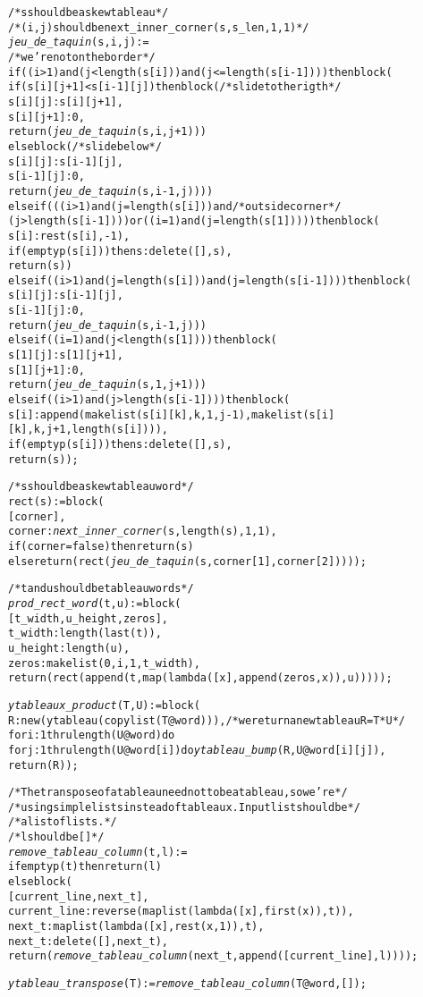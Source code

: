 \begin{alltt}
/* s should be a skew tableau */
/* (i,j) should be next\_inner\_corner (s, s\_len, 1, 1) */
\emph{jeu\_de\_taquin} (s, i, j) :=
/* we're not on the border */
if ((i > 1) and (j < length (s[i])) and (j <= length (s[i-1]))) then block ( 
  if (s[i][j+1] < s[i-1][j]) then block ( /* slide to the rigth */
    s[i][j] : s[i][j+1],
    s[i][j+1] : 0,
    return (\emph{jeu\_de\_taquin} (s, i, j+1)))
  else block ( /* slide below */
    s[i][j] : s[i-1][j],
    s[i-1][j] : 0,
    return (\emph{jeu\_de\_taquin} (s, i-1, j))))
else if (((i > 1) and (j = length (s[i])) and /* outside corner */
        (j > length (s[i-1]))) or ((i = 1) and (j = length (s[1])))) then block (
  s[i] : rest (s[i], -1),
  if (emptyp (s[i])) then s : delete ([], s),
  return (s))
else if ((i > 1) and (j = length (s[i])) and (j = length (s[i-1]))) then block (
  s[i][j] : s[i-1][j],
  s[i-1][j] : 0,
  return (\emph{jeu\_de\_taquin} (s, i-1, j)))
else if ((i = 1) and (j < length (s[1]))) then block (
  s[1][j] : s[1][j+1],
  s[1][j+1] : 0,
  return (\emph{jeu\_de\_taquin} (s, 1, j+1)))
else if ((i > 1) and (j > length (s[i-1]))) then block (
  s[i] : append (makelist (s[i][k], k, 1, j-1), makelist (s[i][k], k, j+1, length (s[i]))),
  if (emptyp (s[i])) then s : delete ([], s),
  return (s));

/* s should be a skew tableau word */
rect (s) := block (
  [corner],
  corner : \emph{next\_inner\_corner} (s, length (s), 1, 1),
  if (corner = false) then return (s)
  else return (rect (\emph{jeu\_de\_taquin} (s, corner[1], corner[2]))));

/* t and u should be tableau words */
\emph{prod\_rect\_word} (t, u) := block (
  [t\_width, u\_height, zeros],
  t\_width : length (last (t)),
  u\_height : length (u),
  zeros : makelist (0, i, 1, t_width),
  return (rect (append (t, map (lambda ([x], append (zeros, x)), u))))); 

\emph{ytableaux\_product} (T,U) := block (
  R : new (ytableau (copylist (T@word))), /* we return a new tableau R = T*U */
  for i : 1 thru length (U@word) do
  for j : 1 thru length (U@word[i]) do \emph{ytableau\_bump} (R, U@word[i][j]),
  return (R));

/* The transpose of a tableau need not to be a tableau, so we're */
/* using simple lists instead of tableaux. Input list should be */
/* a list of lists. */
/* l should be [] */
\emph{remove\_tableau\_column} (t, l) :=
if emptyp (t) then return (l)
else block (
  [current\_line, next\_t],
  current\_line : reverse (maplist (lambda ([x], first (x)), t)),
  next\_t : maplist (lambda ([x], rest (x, 1)), t),
  next\_t : delete ([], next_t),
  return (\emph{remove\_tableau\_column} (next\_t, append ([current\_line], l))));

\emph{ytableau\_transpose} (T) := \emph{remove\_tableau\_column} (T@word, []); 
\end{alltt}
\small

